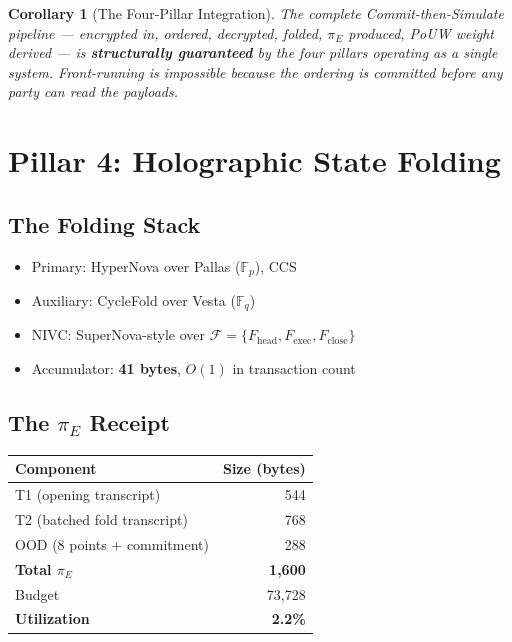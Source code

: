 \documentclass[11pt, a4paper]{article}
\newtheorem{corollary}[theorem]{Corollary}
\begin{document}
\begin{corollary}[The Four-Pillar Integration]
\label{cor:integration}
The complete Commit-then-Simulate pipeline --- encrypted in, ordered,
decrypted, folded, $\pi_E$ produced, PoUW weight derived --- is
\textbf{structurally guaranteed} by the four pillars operating as a
single system. Front-running is impossible because the ordering is
committed before any party can read the payloads.
\end{corollary}

\section{Pillar 4: Holographic State Folding}
\label{sec:folding}

\subsection{The Folding Stack}

\begin{itemize}
\item Primary: HyperNova over Pallas ($\mathbb{F}_p$), CCS
\item Auxiliary: CycleFold over Vesta ($\mathbb{F}_q$)
\item NIVC: SuperNova-style over $\mathcal{F} = \{F_{\text{head}}, F_{\text{exec}}, F_{\text{close}}\}$ \item Accumulator: \textbf{41 bytes}, $O(1)$ in transaction count
\end{itemize}

\subsection{The $\pi_E$ Receipt}

\begin{table}[h]
\centering
{}
\begin{tabular}{lr}
\rowcolor{hsmaPurple!20} \textbf{Component} & \textbf{Size (bytes)} \\
\midrule
T1 (opening transcript) & 544 \\
T2 (batched fold transcript) & 768 \\
OOD (8 points + commitment) & 288 \\
\midrule
\rowcolor{hsmaGreen!15} \textbf{Total $\pi_E$} & \textcolor{hsmaGreen}{\textbf{1{,}600}} \\
Budget & 73{,}728 \\
\textbf{Utilization} & \textbf{2.2\%} \\
\bottomrule
\end{tabular}
\end{table}
\end{document}
